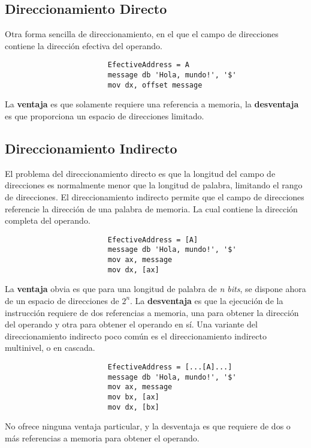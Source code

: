 \documentclass{article}
\begin{document}
\subsection*{Direccionamiento Directo}
Otra forma sencilla de direccionamiento, en el que el campo de direcciones
contiene la direcci\'{o}n efectiva del operando.
\begin{verbatim}
                        EfectiveAddress = A
                        message db 'Hola, mundo!', '$'
                        mov dx, offset message
\end{verbatim}

La \textbf{ventaja} es que solamente requiere una referencia a memoria, la
\textbf{desventaja} es que proporciona un espacio de direcciones limitado.

\subsection*{Direccionamiento Indirecto}
El problema del direccionamiento directo es que la longitud del campo de
direcciones es normalmente menor que la longitud de palabra, limitando el
rango de direcciones. El direccionamiento indirecto permite que el campo de
direcciones referencie la direcci\'{o}n de una palabra de memoria. La cual
contiene la direcci\'{o}n completa del operando.
\begin{verbatim}
                        EfectiveAddress = [A]
                        message db 'Hola, mundo!', '$'
                        mov ax, message
                        mov dx, [ax]
\end{verbatim}

La \textbf{ventaja} obvia es que para una longitud de palabra de \textit{n bits},
se dispone ahora de un espacio de direcciones de \textit{$2^n$}. La
\textbf{desventaja} es que la ejecuci\'{o}n de la instrucci\'{o}n requiere de dos
referencias a memoria, una para obtener la direcci\'{o}n del operando y otra para
obtener el operando en s\'{i}. Una variante del direccionamiento indirecto
poco com\'{u}n es el direccionamiento indirecto multinivel, o en cascada.
\begin{verbatim}
                        EfectiveAddress = [...[A]...]
                        message db 'Hola, mundo!', '$'
                        mov ax, message
                        mov bx, [ax]
                        mov dx, [bx]
\end{verbatim}

No ofrece ninguna ventaja particular, y la desventaja es que requiere de
dos o m\'{a}s referencias a memoria para obtener el operando.
\end{document}
